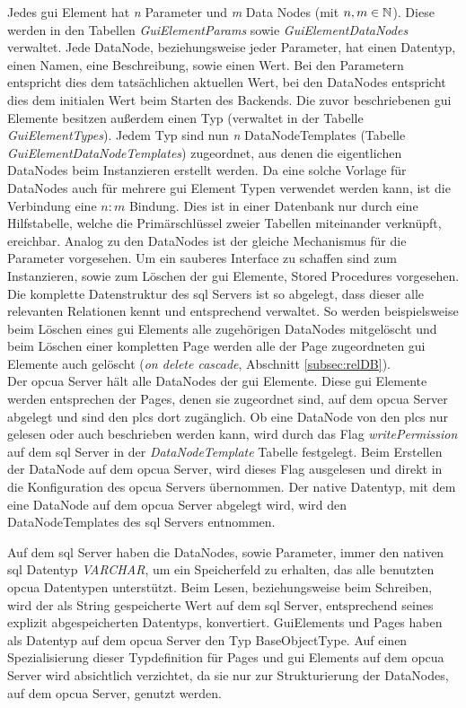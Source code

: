 Jedes \ac{gui} Element hat \emph{n} Parameter und \emph{m} Data Nodes (mit $ n, m \in \mathbb{N} $). 
Diese werden in den Tabellen \emph{GuiElementParams} sowie \emph{GuiElementDataNodes} verwaltet.
Jede DataNode, beziehungsweise jeder Parameter, hat einen Datentyp, einen Namen, eine Beschreibung, sowie einen Wert. 
Bei den Parametern entspricht dies dem tatsächlichen aktuellen Wert, 
bei den DataNodes entspricht dies dem initialen Wert beim Starten des Backends.
Die zuvor beschriebenen \ac{gui} Elemente besitzen außerdem einen Typ (verwaltet in der Tabelle \emph{GuiElementTypes}).
Jedem Typ sind nun \emph{n} DataNodeTemplates (Tabelle \emph{GuiElementDataNodeTemplates}) zugeordnet, 
aus denen die eigentlichen DataNodes beim Instanzieren erstellt werden. Da eine solche Vorlage für DataNodes auch für mehrere \ac{gui} Element Typen verwendet werden kann, 
ist die Verbindung eine $n:m$ Bindung. 
Dies ist in einer Datenbank nur durch eine Hilfstabelle, 
welche die Primärschlüssel zweier Tabellen miteinander verknüpft, ereichbar. 
Analog zu den DataNodes ist der gleiche Mechanismus für die Parameter vorgesehen.
Um ein sauberes Interface zu schaffen sind zum Instanzieren, 
sowie zum Löschen der \ac{gui} Elemente, Stored Procedures vorgesehen.
Die komplette Datenstruktur des \ac{sql} Servers ist so abgelegt, 
dass dieser alle relevanten Relationen kennt und entsprechend verwaltet.
So werden beispielsweise beim Löschen eines \ac{gui} Elements alle zugehörigen DataNodes mitgelöscht und 
beim Löschen einer kompletten Page werden alle der Page zugeordneten \ac{gui} Elemente auch gelöscht (\emph{on delete cascade}, Abschnitt \ref{subsec:relDB}).\\ 
Der \ac{opcua} Server hält alle DataNodes der \ac{gui} Elemente. 
Diese \ac{gui} Elemente werden entsprechen der Pages, denen sie zugeordnet sind, auf dem \ac{opcua} Server abgelegt und 
sind den \acp{plc} dort zugänglich.
Ob eine DataNode von den \acp{plc} nur gelesen oder auch beschrieben werden kann, 
wird durch das Flag \emph{writePermission} auf dem \ac{sql} Server in der \emph{DataNodeTemplate} Tabelle festgelegt. 
Beim Erstellen der DataNode auf dem \ac{opcua} Server, wird dieses Flag ausgelesen und 
direkt in die Konfiguration des \ac{opcua} Servers übernommen.
Der native Datentyp, mit dem eine DataNode auf dem \ac{opcua} Server abgelegt wird, wird den DataNodeTemplates des \ac{sql} Servers entnommen.

Auf dem \ac{sql} Server haben die DataNodes, sowie Parameter, immer den nativen \ac{sql} Datentyp \emph{VARCHAR}, um ein Speicherfeld zu erhalten, das alle benutzten \ac{opcua} Datentypen unterstützt.
Beim Lesen, beziehungsweise beim Schreiben, wird der als String gespeicherte Wert auf dem \ac{sql} Server, 
entsprechend seines explizit abgespeicherten Datentyps, konvertiert. 
GuiElements und Pages haben als Datentyp auf dem \ac{opcua} Server den Typ BaseObjectType.
Auf einen Spezialisierung dieser Typdefinition für Pages und \ac{gui} Elements auf dem \ac{opcua} Server wird absichtlich verzichtet, 
da sie nur zur Strukturierung der DataNodes, auf dem \ac{opcua} Server, genutzt werden.


